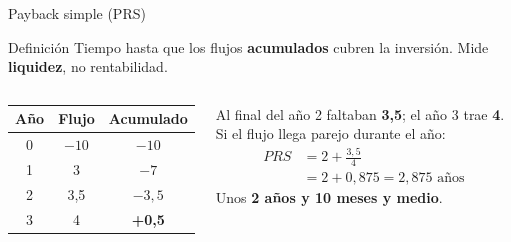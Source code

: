 \documentclass[aspectratio=169,10pt]{beamer}
\begin{document}
\begin{frame}{Payback simple (PRS)}

\begin{block}{Definición}
Tiempo hasta que los flujos \textbf{acumulados} cubren la inversión. Mide \textbf{liquidez}, no rentabilidad.
\end{block}

\begin{columns}[T]
\begin{center}
\begin{tabular}{ccc}
\toprule
Año & Flujo & Acumulado \\
\midrule
0 & $-10$ & $-10$ \\
1 & 3     & $-7$ \\
2 & 3,5   & $-3{,}5$ \\
3 & 4     & \textbf{+0,5} \\
\bottomrule
\end{tabular}
\end{center}

Al final del año 2 faltaban \textbf{3,5}; el año 3 trae \textbf{4}. Si el flujo llega parejo durante el año:
\[
\begin{aligned}
PRS &= 2 + \frac{3{,}5}{4} \\[2pt]
    &= 2 + 0{,}875 = 2{,}875 \text{ años}
\end{aligned}
\]
Unos \textbf{2 años y 10 meses y medio}.
\end{columns}
\end{frame}
\end{document}
